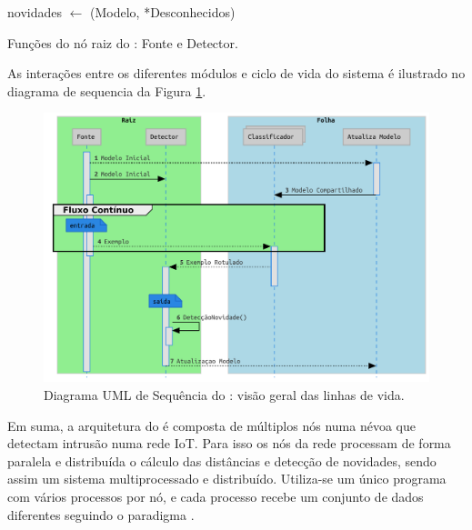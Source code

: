 \begin{algorithm}[htb]
{{{{                    novidades $\leftarrow$ \NoveltyDetection(Modelo, *Desconhecidos)\;
                }
            }
        }
    }
\caption{Funções do nó raiz do \mfog: Fonte e Detector.}
\label{alg:MFOG-root}
\end{algorithm}

As interações entre os diferentes módulos e ciclo de vida do sistema é ilustrado
no diagrama de sequencia da Figura \ref{fig:mfog-mpi-life}.

\begin{figure}[htb]
  \centerline{
    \includegraphics[width=0.9\linewidth,page=1]{figures/lifecycle-uml-svg.pdf}
  }
  \caption{Diagrama UML de Sequência do \mfog: visão geral das linhas de vida.}
  \label{fig:mfog-mpi-life}
\end{figure}

Em suma, a arquitetura do \mfog é composta de múltiplos nós numa névoa que detectam
intrusão numa rede IoT. Para isso os nós da rede processam de forma paralela e
distribuída o cálculo das distâncias e detecção de novidades, sendo assim um
sistema multiprocessado e distribuído. Utiliza-se um único programa com vários
processos por nó, e cada processo recebe um conjunto de dados diferentes
seguindo o paradigma \spmd.

